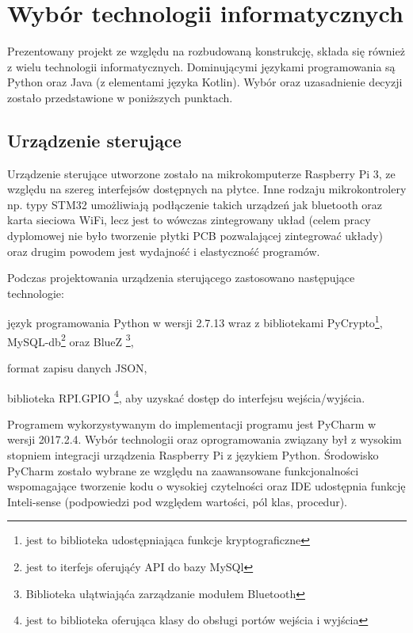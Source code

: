 \newpage\section{Wybór technologii informatycznych} \label{sec:technologie}
Prezentowany projekt ze względu na rozbudowaną konstrukcję, składa się również z wielu technologii informatycznych. Dominującymi językami programowania są Python oraz Java (z elementami języka Kotlin). Wybór oraz uzasadnienie decyzji zostało przedstawione w poniższych punktach.

\subsection{Urządzenie sterujące}
Urządzenie sterujące utworzone zostało na mikrokomputerze Raspberry Pi 3, ze względu na szereg interfejsów dostępnych na płytce. Inne rodzaju mikrokontrolery np. typy STM32 umożliwiają podłączenie takich urządzeń jak bluetooth oraz karta sieciowa WiFi, lecz jest to wówczas zintegrowany układ (celem pracy dyplomowej nie było tworzenie płytki PCB pozwalającej zintegrować układy) oraz drugim powodem jest wydajność i elastyczność programów. 

Podczas projektowania urządzenia sterującego zastosowano następujące technologie:
\begin{itemize*}
	\item język programowania Python w wersji 2.7.13\cite{Pyt} wraz z bibliotekami PyCrypto\footnote{ jest to biblioteka udostępniająca funkcje kryptograficzne}, MySQL-db\footnote{ jest to iterfejs oferująćy API do bazy MySQl  } oraz BlueZ \footnote{Biblioteka ułątwiająća zarządzanie modułem Bluetooth  },
	\item format zapisu danych JSON,
	\item biblioteka RPI.GPIO
	 \footnote{ jest to biblioteka oferująca klasy do obsługi portów  wejścia i wyjścia}, aby uzyskać dostęp do interfejsu wejścia/wyjścia.
\end{itemize*}

Programem wykorzystywanym do implementacji programu jest PyCharm w wersji 2017.2.4. Wybór technologii oraz oprogramowania związany był z wysokim stopniem integracji urządzenia Raspberry Pi z językiem Python. Środowisko PyCharm zostało wybrane ze względu na zaawansowane funkcjonalności wspomagające tworzenie kodu o wysokiej czytelności oraz IDE udostępnia funkcję Inteli-sense (podpowiedzi pod względem wartości, pól klas, procedur).

\newpage
